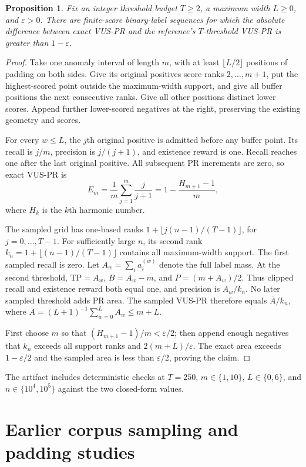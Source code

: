 \documentclass[10pt]{article}
\newtheorem{proposition}{Proposition}
\newcommand{\TP}{\mathrm{TP}}
\begin{document}
\begin{proposition}
Fix an integer threshold budget $T\ge2$, a maximum width $L\ge0$, and
$\varepsilon>0$. There are finite-score binary-label sequences for which the
absolute difference between exact VUS-PR and the reference's $T$-threshold
VUS-PR is greater than $1-\varepsilon$.
\end{proposition}
\begin{proof}
Take one anomaly interval of length $m$, with at least $\lfloor L/2\rfloor$
positions of padding on both sides. Give its original positives score ranks
$2,\ldots,m+1$, put the highest-scored point outside the maximum-width
support, and give all buffer positions the next consecutive ranks. Give all
other positions distinct lower scores. Append further lower-scored negatives
at the right, preserving the existing geometry and scores.

For every $w\le L$, the $j$th original positive is admitted before any buffer
point. Its recall is $j/m$, precision is $j/(j+1)$, and existence reward is
one. Recall reaches one after the last original positive. All subsequent PR
increments are zero, so exact VUS-PR is
\begin{equation}
 E_m=\frac1m\sum_{j=1}^m\frac{j}{j+1}
 =1-\frac{H_{m+1}-1}{m},
\end{equation}
where $H_k$ is the $k$th harmonic number.

The sampled grid has one-based ranks
$1+\lfloor j(n-1)/(T-1)\rfloor$, for $j=0,\ldots,T-1$.
For sufficiently large $n$, its second rank
$k_n=1+\lfloor(n-1)/(T-1)\rfloor$ contains all maximum-width support.
The first sampled recall is zero. Let $A_w=\sum_i a_i^{(w)}$ denote the full
label mass. At the second threshold, $\TP=A_w$, $B=A_w-m$, and
$P=(m+A_w)/2$. Thus clipped recall and existence reward both equal one,
and precision is $A_w/k_n$. No later sampled threshold adds PR area.
The sampled VUS-PR therefore equals
$\overline A/k_n$, where $\overline A=(L+1)^{-1}\sum_{w=0}^L A_w\le m+L$.

First choose $m$ so that $(H_{m+1}-1)/m<\varepsilon/2$; then append enough
negatives that $k_n$ exceeds all support ranks and
$2(m+L)/\varepsilon$. The exact area exceeds $1-\varepsilon/2$ and the
sampled area is less than $\varepsilon/2$, proving the claim.
\end{proof}
The artifact includes deterministic checks at $T=250$, $m\in\{1,10\}$,
$L\in\{0,6\}$, and $n\in\{10^4,10^5\}$ against the two closed-form values.
\section{Earlier corpus sampling and padding studies}
\label{app:corpus}
\end{document}
